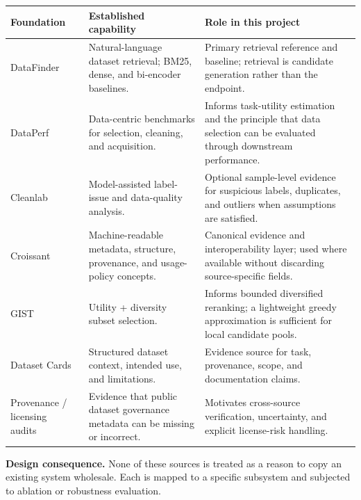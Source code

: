 \documentclass[11pt]{article}
\begin{document}
\begin{longtable}{@{}L{2.6cm}L{5.5cm}L{6.0cm}@{}}
\toprule
\textbf{Foundation} & \textbf{Established capability} & \textbf{Role in this project} \\
\midrule
\endhead
DataFinder~\cite{datafinder} & Natural-language dataset retrieval; BM25, dense, and bi-encoder baselines. &
  Primary retrieval reference and baseline; retrieval is candidate generation rather than the endpoint. \\
DataPerf~\cite{dataperf} & Data-centric benchmarks for selection, cleaning, and acquisition. &
  Informs task-utility estimation and the principle that data selection can be evaluated through downstream
  performance. \\
Cleanlab~\cite{cleanlab} & Model-assisted label-issue and data-quality analysis. &
  Optional sample-level evidence for suspicious labels, duplicates, and outliers when assumptions are
  satisfied. \\
Croissant~\cite{croissant} & Machine-readable metadata, structure, provenance, and usage-policy concepts. &
  Canonical evidence and interoperability layer; used where available without discarding source-specific
  fields. \\
GIST~\cite{gist,gist-blog} & Utility + diversity subset selection. &
  Informs bounded diversified reranking; a lightweight greedy approximation is sufficient for local
  candidate pools. \\
Dataset Cards~\cite{hf-hub} & Structured dataset context, intended use, and limitations. &
  Evidence source for task, provenance, scope, and documentation claims. \\
Provenance / licensing audits~\cite{licensing-audit} & Evidence that public dataset governance metadata can
  be missing or incorrect. & Motivates cross-source verification, uncertainty, and explicit license-risk
  handling. \\
\bottomrule
\end{longtable}

\textbf{Design consequence.} None of these sources is treated as a reason to copy an existing system
wholesale. Each is mapped to a specific subsystem and subjected to ablation or robustness evaluation.

\end{document}
